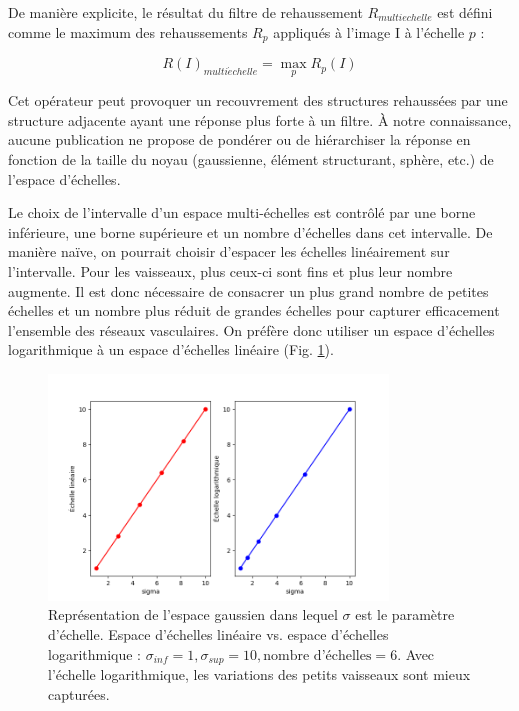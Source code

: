   De manière explicite, le résultat du filtre de rehaussement $R_{multi echelle}$ est défini comme le maximum des rehaussements $R_{p}$ appliqués à l'image I à l'échelle $p$ :
  
  \begin{equation}
    R(I)_{multi \acute echelle} = \max_{p}R_{p}(I) 
  \end{equation}

  
  Cet opérateur peut provoquer un recouvrement des structures rehaussées par une structure adjacente ayant une réponse plus forte à un filtre. À notre connaissance, aucune publication ne propose de pondérer ou de hiérarchiser la réponse en fonction de la taille du noyau (gaussienne, élément structurant, sphère, etc.) de l'espace d'échelles.

  Le choix de l'intervalle d'un espace multi-échelles est contrôlé par une borne inférieure, une borne supérieure et un nombre d'échelles dans cet intervalle. De manière naïve, on pourrait choisir d'espacer les échelles linéairement sur l'intervalle. Pour les vaisseaux, plus ceux-ci sont fins et plus leur nombre augmente. Il est donc nécessaire de consacrer un plus grand nombre de petites échelles  et un nombre plus réduit de grandes échelles pour capturer efficacement l'ensemble des réseaux vasculaires. On préfère donc utiliser un espace d'échelles logarithmique à un espace d'échelles linéaire (Fig. \ref{fig:scale_space}).

  \begin{figure}[!ht]
    \centering
    \includegraphics[height=6cm]{Images/scale_space.png}
    \caption{Représentation de l'espace gaussien dans lequel $\sigma$ est le paramètre d'échelle. Espace d'échelles linéaire vs. espace d'échelles logarithmique : $\sigma_{inf}=1, \sigma_{sup}=10, \textrm{nombre d'échelles}=6$. Avec l'échelle logarithmique, les variations des petits vaisseaux sont mieux capturées.}
    \label{fig:scale_space}
  \end{figure}


